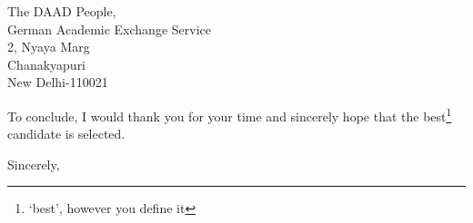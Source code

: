 \documentclass{letter}
\begin{document}
\begin{letter}{The DAAD People,\\German Academic Exchange Service\\2, Nyaya Marg\\Chanakyapuri\\New Delhi-110021}
\begin{enumerate}





\end{enumerate}


To conclude, I would thank you for your time and sincerely hope that the best\footnote{`best', however you define it} candidate is selected.


\vspace{2\parskip} %
\closing{Sincerely,}
\vspace{2\parskip} %




\end{letter}
 
\end{document}
